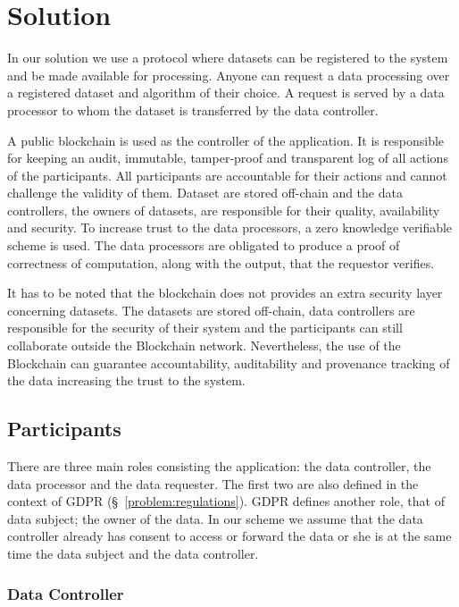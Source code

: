 \chapter{Solution}
\label{solution}

In our solution we use a protocol where datasets can be registered to the system and be made available for processing. Anyone can request a data processing over a registered dataset and algorithm of their choice. A request is served by a data processor to whom the dataset is transferred by the data controller.

A public blockchain is used as the controller of the application. It is responsible for keeping an audit, immutable, tamper-proof and transparent log of all actions of the participants. All participants are accountable for their actions and cannot challenge the validity of them. Dataset are stored off-chain and the data controllers, the owners of datasets, are responsible for their quality, availability and security. To increase trust to the data processors, a zero knowledge verifiable scheme is used. The data processors are obligated to produce a proof of correctness of computation, along with the output, that the requestor verifies.

It has to be noted that the blockchain does not provides an extra security layer concerning datasets. The datasets are stored off-chain, data controllers are responsible for the security of their system and the participants can still collaborate outside the Blockchain network. Nevertheless, the use of the Blockchain can guarantee accountability, auditability and provenance tracking of the data increasing the trust to the system.

\section{Participants}
\label{solution:entities}

There are three main roles consisting the application: the data controller, the data processor
and the data requester. The first two are also defined in the context of GDPR (§~\ref{problem:regulations}).
GDPR defines another role, that of data subject; the owner of the data.
In our scheme we assume that the data controller already has consent to access or forward the data or she is at the same time the data subject and the data controller.

\subsection{Data Controller}
\label{solution:entities:data_controller}

